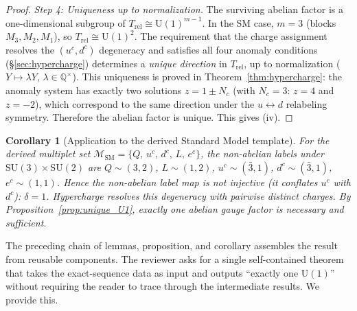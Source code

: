 \documentclass[11pt,a4paper]{article}
\newtheorem{corollary}[theorem]{Corollary}
\theoremstyle{definition}
\newcommand{\SU}{\mathrm{SU}}
\newcommand{\U}{\mathrm{U}}
\begin{document}
\begin{proof}
\textit{Step 4: Uniqueness up to normalization.}\quad
The surviving abelian factor is a one-dimensional subgroup of
$T_{\mathrm{rel}} \cong \mathrm{U}(1)^{m-1}$.  In the SM case,
$m = 3$ (blocks $M_3, M_2, M_1$), so $T_{\mathrm{rel}} \cong
\mathrm{U}(1)^2$.  The requirement that the charge assignment
resolves the $(u^c, d^c)$ degeneracy and satisfies all four anomaly
conditions (\S\ref{sec:hypercharge}) determines a \emph{unique
direction} in $T_{\mathrm{rel}}$, up to normalization
($Y \mapsto \lambda Y$, $\lambda \in \mathbb{Q}^\times$).  This
uniqueness is proved in Theorem~\ref{thm:hypercharge}: the anomaly
system has exactly two solutions $z = 1 \pm N_c$ (with $N_c = 3$:
$z = 4$ and $z = -2$), which correspond to the same direction
under the $u \leftrightarrow d$ relabeling symmetry.  Therefore
the abelian factor is unique.  This gives (iv).
\end{proof}

\begin{corollary}[Application to the derived Standard Model template]
\label{cor:unique_U1_SM}
For the derived multiplet set
$\mathcal{M}_{\mathrm{SM}} = \{Q,\, u^c,\, d^c,\, L,\, e^c\}$,
the non-abelian labels under $\SU(3) \times \SU(2)$ are
$Q \sim (3,2)$, $L \sim (1,2)$, $u^c \sim (\bar{3},1)$,
$d^c \sim (\bar{3},1)$, $e^c \sim (1,1)$.
Hence the non-abelian label map is not injective (it conflates $u^c$
with $d^c$): $\delta = 1$.  Hypercharge resolves this degeneracy with
pairwise distinct charges.  By Proposition~\ref{prop:unique_U1},
exactly one abelian gauge factor is necessary and sufficient.
\end{corollary}

The preceding chain of lemmas, proposition, and corollary assembles the
result from reusable components.  The reviewer asks for a single
self-contained theorem that takes the exact-sequence data as input and
outputs ``exactly one $\U(1)$'' without requiring the reader to trace
through the intermediate results.  We provide this.
\end{document}
